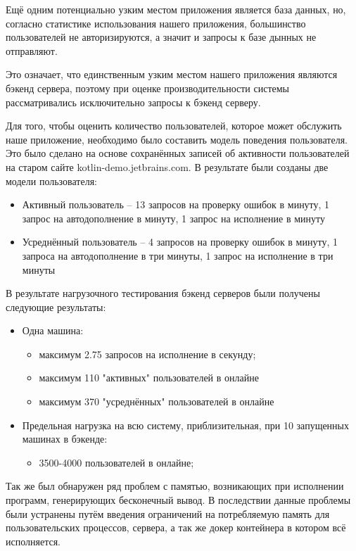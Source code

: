 	Ещё одним потенциально узким местом приложения является база данных, но, согласно статистике использования нашего приложения, большинство пользователей не авторизируются, а значит и запросы к базе дынных не отправляют.
	
	Это означает, что единственным узким местом нашего приложения являются бэкенд сервера, поэтому при оценке производительности системы рассматривались исключительно запросы к бэкенд серверу.

	Для того, чтобы оценить количество пользователей, которое может обслужить наше приложение, необходимо было составить модель поведения пользователя. Это было сделано на основе сохранённых записей об активности пользователей на старом сайте kotlin-demo.jetbrains.com. В результате были созданы две модели пользователя:
\begin{itemize}
	\item Активный пользователь -- 13 запросов на проверку ошибок в минуту, 1 запрос на автодополнение в минуту, 1 запрос на исполнение в минуту
	\item Усреднённый пользователь -- 4 запросов на проверку ошибок в минуту, 1 запроса на автодополнение в три минуты, 1 запрос на исполнение в три минуты
\end{itemize}
	
	В результате нагрузочного тестирования бэкенд серверов были получены следующие результаты:
	\begin{itemize}
		\item Одна машина:
		\begin{itemize}
			\item максимум 2.75 запросов на исполнение в секунду;
			\item максимум 110 "активных" пользователей в онлайне
			\item максимум 370 "усреднённых" пользователей в онлайне 
		\end{itemize}
		
		\item Предельная нагрузка на всю систему, приблизительная, при 10 запущенных машинах в бэкенде:
		\begin{itemize}
			\item 3500-4000 пользователей в онлайне;
		\end{itemize} 
	\end{itemize}
	Так же был обнаружен ряд проблем с памятью, возникающих при исполнении программ, генерирующих бесконечный вывод. В последствии данные проблемы были устранены путём введения ограничений на потребляемую память для пользовательских процессов, сервера, а так же докер контейнера в котором всё исполняется.
	
